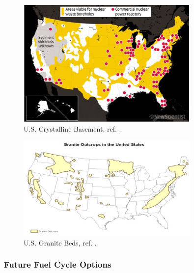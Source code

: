 \begin{frame}[ctb!]
\begin{minipage}{0.44\textwidth}
\begin{figure}[h!]
         \includegraphics[width=0.8\textwidth]{./images/boreholeNewScientist.eps}
         \caption{U.S. Crystalline Basement, ref.  \cite{newscientist_where_2011}.}
     \end{figure}
     \begin{figure}[h!]
         \includegraphics[width=0.8\textwidth]{./images/graniteBush.eps}
         \caption{U.S. Granite Beds, ref. \cite{bush_economic_1976}.}
     \end{figure}
   \end{minipage}
\end{frame}


\begin{frame}[ctb!]
  \frametitle{Future Fuel Cycle Options}
    
\end{frame}


